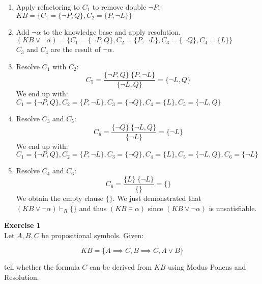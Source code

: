 \documentclass{article}
\begin{document}
\begin{enumerate}
    \item Apply refactoring to $C_1$ to remove double $\neg P$: \\
    $KB = \{C_1=\{\neg P, Q\}, C_2=\{P, \neg L\}\}$
    \item Add $\neg \alpha$ to the knowledge base and apply resolution. \\
    $(KB \lor \neg \alpha) = \{C_1=\{\neg P, Q\}, C_2=\{P, \neg L\}, C_3 = \{\neg Q\}, C_4 = \{L\} \}$ \\
    $C_3$ and $C_4$ are the result of $\neg \alpha$.
    \item Resolve $C_1$ with $C_2$:
    \begin{equation*}
        C_5 = \frac{\{\neg P, Q\}\ \{P, \neg L\}}{\{\neg L, Q\}} = \{\neg L, Q\}
    \end{equation*}
    We end up with:\\
    $C_1=\{\neg P, Q\}, C_2=\{P, \neg L\}, C_3 = \{\neg Q\}, C_4 = \{L\}, C_5=\{\neg L, Q\}$
    \item Resolve $C_3$ and $C_5$:
    \begin{equation*}
        C_6 = \frac{\{\neg Q\}\ \{\neg L, Q\}}{\{\neg L\}} = \{\neg L\}
    \end{equation*}
    We end up with:\\
    $C_1=\{\neg P, Q\}, C_2=\{P, \neg L\}, C_3 = \{\neg Q\}, C_4 = \{L\}, C_5=\{\neg L, Q\}, C_6=\{\neg L\}$
    \item Resolve $C_4$ and $C_6$:
    \begin{equation*}
        C_6 = \frac{\{L\}\ \{\neg L\}}{\{\}} = \{\}
    \end{equation*}
    We obtain the empty clause $\{\}$. We just demonstrated that $(KB \lor \neg \alpha) \vdash_R \{\}$ and thus $(KB \models \alpha)$ since $(KB \lor \neg \alpha)$ is unsatisfiable. 
\end{enumerate}

\newpage

\textbf{Exercise 1} \\

Let $A, B, C$ be propositional symbols. Given:

\begin{equation*}
    KB = \{A \implies C, B \implies C, A \lor B \}
\end{equation*}

tell whether the formula $C$ can be derived from $KB$ using Modus Ponens and Resolution.
\end{document}
